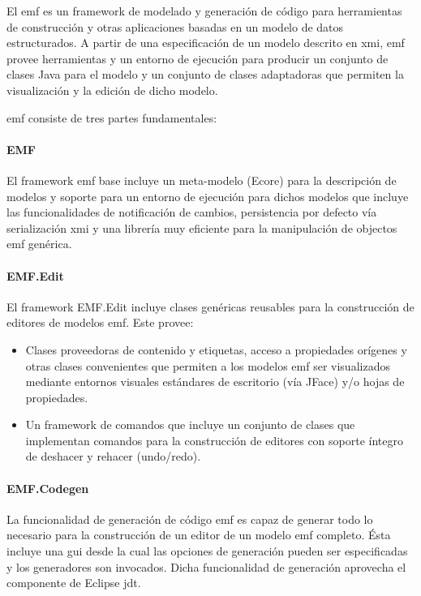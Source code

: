 \documentclass[a4paper,12pt,oneside,spanish]{book}
\begin{document}
El \gls{emf} es un framework de modelado y generación de código para herramientas de construcción y otras aplicaciones basadas en un modelo de datos estructurados. A partir de una especificación de un modelo descrito en \gls{xmi}, \gls{emf} provee herramientas y un entorno de ejecución para producir un conjunto de clases Java para el modelo y un conjunto de clases adaptadoras que permiten la visualización y la edición de dicho modelo.

\gls{emf} consiste de tres partes fundamentales:

\paragraph{EMF}

El framework \gls{emf} base incluye un meta-modelo (Ecore) para la descripción de modelos y soporte para un entorno de ejecución para dichos modelos que incluye las funcionalidades de notificación de cambios, persistencia por defecto vía serialización \gls{xmi} y una librería muy eficiente para la manipulación de objectos \gls{emf} genérica.

\paragraph{EMF.Edit}

El framework EMF.Edit incluye clases genéricas reusables para la construcción de editores de modelos \gls{emf}. Este provee:

\begin{itemize}

\item Clases proveedoras de contenido y etiquetas, acceso a propiedades orígenes y otras clases convenientes que permiten a los modelos \gls{emf} ser visualizados mediante entornos visuales estándares de escritorio (vía JFace) y/o hojas de propiedades.

\item Un framework de comandos que incluye un conjunto de clases que implementan comandos para la construcción de editores con soporte íntegro de deshacer y rehacer (undo/redo).

\end{itemize}

\paragraph{EMF.Codegen}

La funcionalidad de generación de código \gls{emf} es capaz de generar todo lo necesario para la construcción de un editor de un modelo \gls{emf} completo. Ésta incluye una \gls{gui} desde la cual las opciones de generación pueden ser especificadas y los generadores son invocados. Dicha funcionalidad de generación aprovecha el componente de Eclipse \gls{jdt}.
\end{document}
